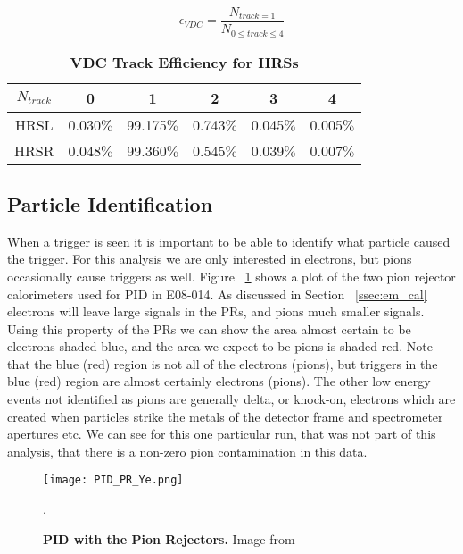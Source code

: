 \begin{equation} \label{eq:vdc_eff}
	\epsilon_{VDC} = \frac{N_{track=1}}{N_{0 \leq track \leq 4}}
\end{equation}

\begin{table}[!h]
\centering
\begin{tabular}{|c c c c c c|}
\hline
\textbf{$N_{track}$} & \textbf{0} & \textbf{1} & \textbf{2} & \textbf{3} & \textbf{4}\\
\hline
HRSL & 0.030$\%$ & 99.175$\%$ & 0.743$\%$ & 0.045$\%$ & 0.005$\%$ \\  
HRSR & 0.048$\%$ & 99.360$\%$ & 0.545$\%$ & 0.039$\%$ & 0.007$\%$ \\ 
\hline
\end{tabular}
\caption{{\bf{VDC Track Efficiency for HRSs}} }
\label{tab:vdc_eff}
\end{table}

\subsection{Particle Identification}
\label{ssec:pid}

When a trigger is seen it is important to be able to identify what particle caused the trigger. For this analysis we are only interested in electrons, but pions occasionally cause triggers as well. Figure ~\ref{fig:pid_pr_ye} shows a plot of the two pion rejector calorimeters used for PID in E08-014. As discussed in Section ~\ref{ssec:em_cal} electrons will leave large signals in the PRs, and pions much smaller signals. Using this property of the PRs we can show the area almost certain to be electrons shaded blue, and the area we expect to be pions is shaded red. Note that the blue (red) region is not all of the electrons (pions), but triggers in the blue (red) region are almost certainly electrons (pions). The other low energy events not identified as pions are generally delta, or knock-on, electrons which are created when particles strike the metals of the detector frame and spectrometer apertures etc. We can see for this one particular run, that was not part of this analysis, that there is a non-zero pion contamination in this data. 

\begin{figure}[!ht]
\begin{center}
\texttt{[image: PID\_PR\_Ye.png]}
\end{center}
\caption{
{\bf{PID with the Pion Rejectors.}} Image from ~\cite{Thesis:Ye}}.
\label{fig:pid_pr_ye}
\end{figure}

